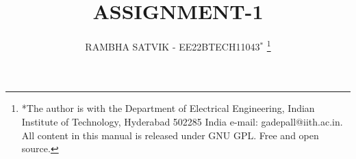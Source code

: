 \documentclass[journal,12pt,twocolumn]{IEEEtran}
\theoremstyle{remark}
\begin{document}
%




\vspace{3cm}

\title{
ASSIGNMENT-1
}
\author{ RAMBHA SATVIK - EE22BTECH11043$^{*}$%
	\thanks{*The author is with the Department
		of Electrical Engineering, Indian Institute of Technology, Hyderabad
		502285 India e-mail:  gadepall@iith.ac.in. All content in this manual is released under GNU GPL.  Free and open source.}
	
}	


%
%
%

% 
%
\end{document}
